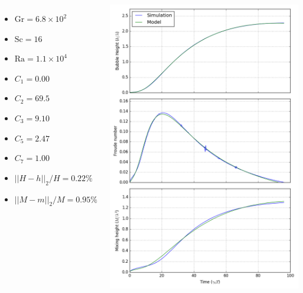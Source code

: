 \documentclass[12pt]{beamer}
\begin{document}
\begin{frame}[plain]
\begin{columns}[c]
\begin{itemize}
  \item $\text{Gr} = 6.8 \times 10^2$
  \item $\text{Sc} = 16$
  \item $\text{Ra} = 1.1 \times 10^4$
  \item $C_1 = 0.00$
  \item $C_2 = 69.5$
  \item $C_3 = 9.10$
  \item $C_5 = 2.47$
  \item $C_7 = 1.00$
  \item $||H-h||_2/H = 0.22\%$
  \item $||M-m||_2/M = 0.95\%$
\end{itemize}
\includegraphics[height=1.05\textheight]{graphics/H-64-4.png}
\end{columns}
\end{frame}
\end{document}
